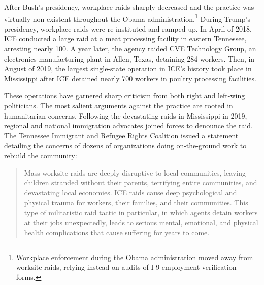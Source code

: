 \documentclass[hidelinks,twoside]{article}
\begin{document}
After Bush’s presidency, workplace raids sharply decreased and the practice was virtually non-existent throughout the Obama administration.\footnote{Workplace enforcement during the Obama administration moved away from worksite raids, relying instead on audits of I-9 employment verification forms.} During Trump's presidency, workplace raids were re-instituted and ramped up. In April of 2018, ICE conducted a large raid at a meat processing facility in eastern Tennessee, arresting nearly 100. A year later, the agency raided CVE Technology Group, an electronics manufacturing plant in Allen, Texas, detaining 284 workers. Then, in August of 2019, the largest single-state operation in ICE’s history took place in Mississippi after ICE detained nearly 700 workers in poultry processing facilities. 

These operations have garnered sharp criticism from both right and left-wing politicians. The most salient arguments against the practice are rooted in humanitarian concerns. Following the devastating raids in Mississippi in 2019, regional and national immigration advocates joined forces to denounce the raid. The Tennessee Immigrant and Refugee Rights Coalition \citeyearpar{tennessee_2019_tirrc} issued a statement detailing the concerns of dozens of organizations doing on-the-ground work to rebuild the community:

\par
\begin{quote}
     Mass worksite raids are deeply disruptive to local communities, leaving children stranded without their parents, terrifying entire communities, and devastating local economies. ICE raids cause deep psychological and physical trauma for workers, their families, and their communities. This type of militaristic raid tactic in particular, in which agents detain workers at their jobs unexpectedly, leads to serious mental, emotional, and physical health complications that cause suffering for years to come.
\end{quote}
\end{document}
